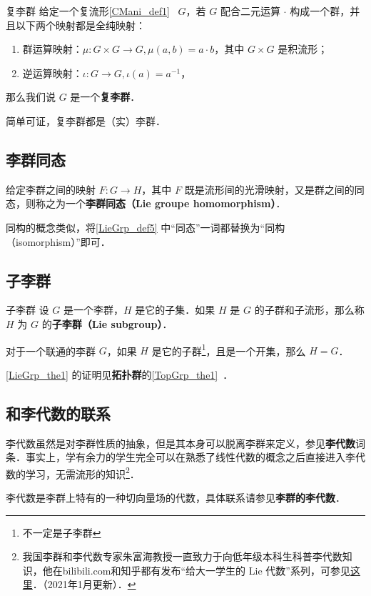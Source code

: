 \begin{definition}{复李群}\label{LieGrp_def6}
给定一个复流形\autoref{CMani_def1}~ $G$，若 $G$ 配合二元运算 $\cdot$ 构成一个群，并且以下两个映射都是全纯映射：
\begin{enumerate}
\item 群运算映射：$\mu:G\times G\to G, \mu(a,b)=a\cdot b$，其中 $G\times G$ 是积流形；
\item 逆运算映射：$\iota:G\to G, \iota(a)=a^{-1}$，
\end{enumerate}
那么我们说 $G$ 是一个\textbf{复李群}．
\end{definition}
简单可证，复李群都是（实）李群．

\subsection{李群同态}

\begin{definition}{}\label{LieGrp_def5}
给定李群之间的映射 $F:G\to H$，其中 $F$ 既是流形间的光滑映射，又是群之间的同态，则称之为一个\textbf{李群同态（Lie groupe homomorphism）}．
\end{definition}

同构的概念类似，将\autoref{LieGrp_def5} 中“同态”一词都替换为“同构（isomorphism）”即可．

\subsection{子李群}

\begin{definition}{子李群}
设 $G$ 是一个李群，$H$ 是它的子集．如果 $H$ 是 $G$ 的子群和子流形，那么称 $H$ 为 $G$ 的\textbf{子李群（Lie subgroup）}．
\end{definition}

\begin{theorem}{}\label{LieGrp_the1}
对于一个联通的李群 $G$，如果 $H$ 是它的子群\footnote{不一定是子李群}，且是一个开集，那么 $H=G$．
\end{theorem}

\autoref{LieGrp_the1} 的证明见\textbf{拓扑群}的\autoref{TopGrp_the1}~．


\subsection{和李代数的联系}

李代数虽然是对李群性质的抽象，但是其本身可以脱离李群来定义，参见\textbf{李代数}词条．事实上，学有余力的学生完全可以在熟悉了线性代数的概念之后直接进入李代数的学习，无需流形的知识\footnote{我国李群和李代数专家朱富海教授一直致力于向低年级本科生科普李代数知识，他在bilibili.com和知乎都有发布“给大一学生的 Lie 代数”系列，可参见\href{https://space.bilibili.com/509086270?from=search&seid=2394735306274350134和https://zhuanlan.zhihu.com/p/161735986}{这里}．（2021年1月更新）．}．

李代数是李群上特有的一种切向量场的代数，具体联系请参见\textbf{李群的李代数}．




